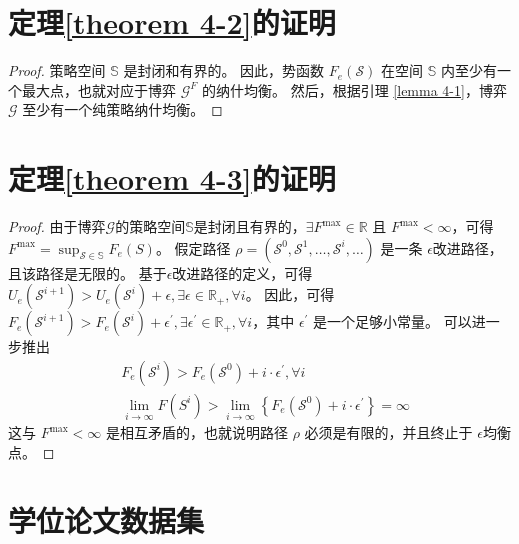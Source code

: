 \section{定理\ref{theorem 4-2}的证明}
\label{appendix h}
\begin{proof}
策略空间 $\mathbb{S}$ 是封闭和有界的。 
因此，势函数 $F_{e}(\mathcal{S})$ 在空间 $\mathbb{S}$ 内至少有一个最大点，也就对应于博弈 $\mathcal{G}^{F}$ 的纳什均衡。 
然后，根据引理 \ref{lemma 4-1}，博弈 $\mathcal{G}$ 至少有一个纯策略纳什均衡。
\end{proof}

\section{定理\ref{theorem 4-3}的证明}
\label{appendix i}
\begin{proof}
由于博弈$\mathcal{G}$的策略空间$\mathbb{S}$是封闭且有界的，$\exists F^{\max} \in \mathbb{R}$ 且 $F^{\max} < \infty$，可得$F^{\max} = \sup _{\mathcal{S} \in \mathbb{S}} F_{e}(S)$。
假定路径 $\rho=\left(\mathcal{S}^{0}, \mathcal{S}^{1}, \ldots, \mathcal{S}^{i}, \ldots\right)$ 是一条 $\epsilon$改进路径，且该路径是无限的。
基于$\epsilon$改进路径的定义，可得$U_{e}\left(\mathcal{S}^{i+1}\right) > U_{e}\left(\mathcal{S}^{i}\right) + \epsilon, \exists \epsilon \in \mathbb{R}_{+}, \forall i$。
因此，可得$F_{e}\left(\mathcal{S}^{i+1}\right) > F_{e}\left(\mathcal{S}^{i}\right) + \epsilon^{\prime}, \exists \epsilon^{\prime} \in \mathbb{R}_{+}, \forall i$，其中 $\epsilon^{\prime}$ 是一个足够小常量。
可以进一步推出
\begin{equation}
	\begin{aligned}
		&F_{e}\left(\mathcal{S}^{i}\right) > F_{e}\left(\mathcal{S}^{0}\right) + i \cdot  \epsilon^{\prime}, \forall i \\
		&\lim _{i \rightarrow \infty} F\left(S^{i}\right) > \lim _{i \rightarrow \infty} \left \{ F_{e}\left(\mathcal{S}^{0}\right) + i \cdot  \epsilon^{\prime} \right\} =\infty
	\end{aligned}
\end{equation}
这与 $F^{\max} < \infty$ 是相互矛盾的，也就说明路径 $\rho$ 必须是有限的，并且终止于 $\epsilon$均衡点。
\end{proof}

\section{学位论文数据集}

